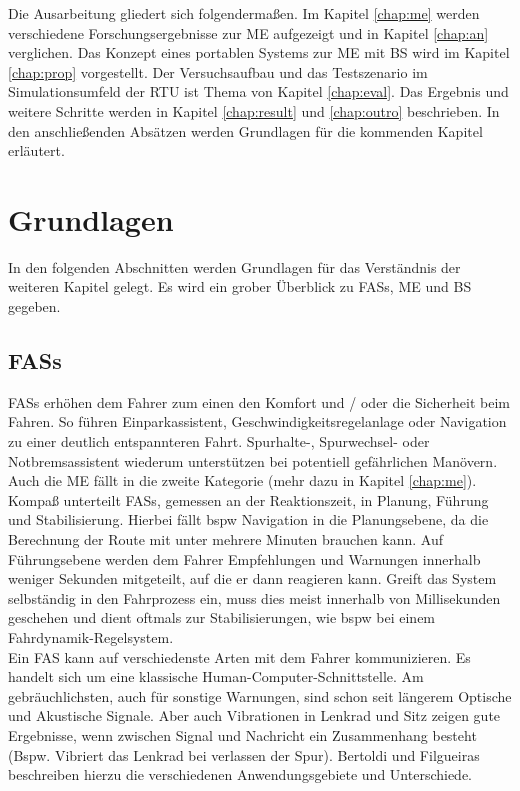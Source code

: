 {Die Ausarbeitung gliedert sich folgendermaßen. Im Kapitel \ref{chap:me} werden verschiedene Forschungsergebnisse zur \acl{ME} aufgezeigt und in Kapitel \ref{chap:an} verglichen. Das Konzept eines portablen Systems zur \acl{ME} mit \acl{BS} wird im Kapitel \ref{chap:prop} vorgestellt. Der Versuchsaufbau und das Testszenario im Simulationsumfeld der \acl{RTU} ist Thema von Kapitel \ref{chap:eval}. Das Ergebnis und weitere Schritte werden in Kapitel \ref{chap:result} und \ref{chap:outro} beschrieben. In den anschließenden Absätzen werden Grundlagen für die kommenden Kapitel erläutert.

\section{Grundlagen}
In den folgenden Abschnitten werden Grundlagen für das Verständnis der weiteren Kapitel gelegt. Es wird ein grober Überblick zu \acl{FASs}, \acl{ME} und \acl{BS} gegeben.

\subsection{\acl{FASs}}
\acl{FASs} erhöhen dem Fahrer zum einen den Komfort und / oder die Sicherheit beim Fahren. So führen Einparkassistent,  Geschwindigkeitsregelanlage oder Navigation zu einer deutlich entspannteren Fahrt. Spurhalte-, Spurwechsel- oder Notbremsassistent wiederum unterstützen bei potentiell gefährlichen Manövern. Auch die \acl{ME} fällt in die zweite Kategorie (mehr dazu in Kapitel \ref{chap:me}).\\

Kompaß \cite{fasFuture} unterteilt \acl{FASs}, gemessen an der Reaktionszeit, in Planung, Führung und Stabilisierung. Hierbei fällt \acl{bspw} Navigation in die Planungsebene, da die Berechnung der Route mit unter mehrere Minuten brauchen kann. Auf Führungsebene werden dem Fahrer Empfehlungen und Warnungen innerhalb weniger Sekunden mitgeteilt, auf die er dann reagieren kann. Greift das System selbständig in den Fahrprozess ein, muss dies meist innerhalb von Millisekunden geschehen und dient oftmals zur Stabilisierungen, wie \acl{bspw} bei einem Fahrdynamik-Regelsystem.\\

Ein \acl{FAS} kann auf verschiedenste Arten mit dem Fahrer kommunizieren. Es handelt sich um eine klassische Human-Computer-Schnittstelle. Am gebräuchlichsten, auch für sonstige Warnungen, sind schon seit längerem Optische und Akustische Signale. Aber auch Vibrationen in Lenkrad und Sitz zeigen gute Ergebnisse, wenn zwischen Signal und Nachricht ein Zusammenhang besteht (Bspw. Vibriert das Lenkrad bei verlassen der Spur). Bertoldi und Filgueiras \cite{Bertoldi:2010:MAD:2002368.2002370} beschreiben hierzu die verschiedenen Anwendungsgebiete und Unterschiede. \\

}
